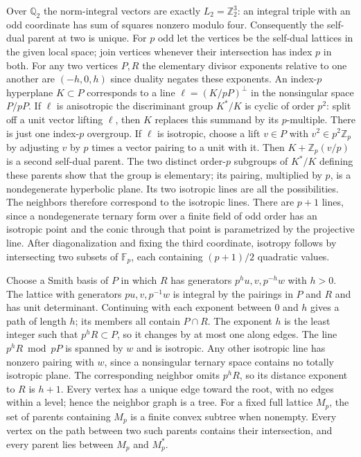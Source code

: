 Over $\mathbb Q_2$ the norm-integral vectors are exactly
$L_2=\mathbb Z_2^3$: an integral triple with an odd coordinate has sum
of squares nonzero modulo four. Consequently the self-dual parent at two
is unique. For $p$ odd let the vertices be the self-dual lattices in
the given local space; join vertices whenever their intersection has
index $p$ in both. For any two vertices $P,R$ the elementary divisor
exponents relative to one another are $(-h,0,h)$ since duality negates
these exponents. An index-$p$ hyperplane $K\subset P$ corresponds to
a line $\ell=(K/pP)^\perp$ in the nonsingular space $P/pP$. If
$\ell$ is anisotropic the discriminant group $K^*/K$ is cyclic of
order $p^2$: split off a unit vector lifting $\ell$, then $K$ replaces
this summand by its $p$-multiple. There is just one index-$p$ overgroup.
If $\ell$ is isotropic, choose a lift $v\in P$ with $v^2\in p^2\mathbb Z_p$
by adjusting $v$ by $p$ times a vector pairing to a unit with it.
Then $K+\mathbb Z_p(v/p)$ is a second self-dual parent. The two
distinct order-$p$ subgroups of $K^*/K$ defining these parents show
that the group is elementary; its pairing, multiplied by $p$, is a
nondegenerate hyperbolic plane. Its two isotropic lines are all the
possibilities. The neighbors therefore correspond to the isotropic lines. There are $p+1$ lines, since a nondegenerate ternary
form over a finite field of odd order has an isotropic point and the
conic through that point is parametrized by the projective line.
After diagonalization and fixing the third coordinate, isotropy follows
by intersecting two subsets of $\mathbb F_p$, each containing $(p+1)/2$
quadratic values.

Choose a Smith basis of $P$ in which $R$ has generators
$p^h u,v,p^{-h}w$ with $h>0$. The lattice with generators
$pu,v,p^{-1}w$ is integral by the pairings in $P$ and $R$ and has
unit determinant. Continuing with each exponent between 0 and $h$
gives a path of length $h$; its members all contain $P\cap R$.
The exponent $h$ is the least integer such that $p^hR\subset P$,
so it changes by at most one along edges. The line $p^hR\bmod pP$
is spanned by $w$ and is isotropic. Any other isotropic line has
nonzero pairing with $w$, since a nonsingular ternary space contains
no totally isotropic plane. The corresponding neighbor omits $p^hR$,
so its distance exponent to $R$ is $h+1$. Every vertex has a unique edge toward the root, with no edges
within a level; hence the neighbor graph is a tree. For a fixed full lattice $M_p$, the set of parents containing $M_p$
is a finite convex subtree when nonempty. Every vertex on the path
between two such parents contains their intersection, and every parent
lies between $M_p$ and $M_p^*$.

